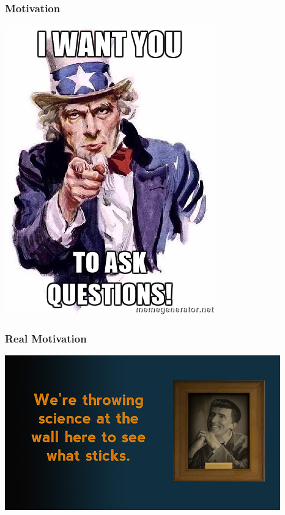 \documentclass[handout]{beamer}
\begin{document}
\begin{frame}
\frametitle{Motivation}
	\begin{center}
		\includegraphics[scale=0.6]{./images/uncle_sam.jpg}
	\end{center}
\end{frame}

\begin{frame}
	\frametitle{Real Motivation}
	\href{run:./sound/Cave_Johnson_athletes.wav}{}
	\begin{center}
		\includegraphics[scale=0.5]{./images/cave_johnson.jpg}
	\end{center}
\end{frame}
\end{document}

